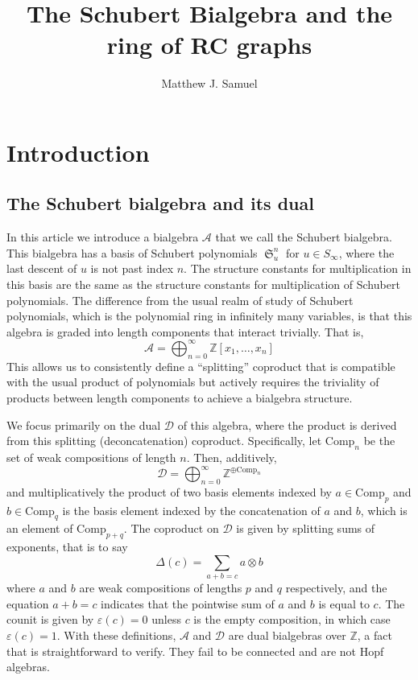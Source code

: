 \documentclass{amsart}
\title{The Schubert Bialgebra and the ring of RC graphs}
\author{Matthew J. Samuel}
\theoremstyle{definition}
\theoremstyle{remark}
\numberwithin{equation}{subsection}
\DeclareMathOperator{\sch}{\mathfrak{S}}
\newcommand{\coma}{\mathcal{A}}
\newcommand{\dcoma}{\mathcal{D}}
\begin{document}
	\maketitle
	
\section{Introduction}

\subsection*{The Schubert bialgebra and its dual} In this article we introduce a bialgebra $\coma$ that we call the Schubert bialgebra. This bialgebra has a basis of Schubert polynomials $\sch_u^n$ for $u\in S_\infty$, where the last descent of $u$ is not past index $n$. The structure constants for multiplication in this basis are the same as the structure constants for multiplication of Schubert polynomials. The difference from the usual realm of study of Schubert polynomials, which is the polynomial ring in infinitely many variables, is that this algebra is graded into length components that interact trivially. That is,
$$\coma = \bigoplus_{n=0}^\infty \mathbb{Z}[x_1,\ldots,x_n]$$
This allows us to consistently define a ``splitting'' coproduct that is compatible with the usual product of polynomials but actively requires the triviality of products between length components to achieve a bialgebra structure.

We focus primarily on the dual $\dcoma$ of this algebra, where the product is derived from this splitting (deconcatenation) coproduct. Specifically, let $\mathrm{Comp}_n$ be the set of weak compositions of length $n$. Then, additively,
$$\dcoma = \bigoplus_{n=0}^\infty \mathbb{Z}^{\oplus \mathrm{Comp}_n}$$
and multiplicatively the product of two basis elements indexed by $a\in \mathrm{Comp}_p$ and $b\in \mathrm{Comp}_q$ is the basis element indexed by the concatenation of $a$ and $b$, which is an element of $\mathrm{Comp}_{p+q}$. The coproduct on $\dcoma$ is given by splitting sums of exponents, that is to say
$$\Delta(c) = \sum_{a+b=c} a\otimes b$$
where $a$ and $b$ are weak compositions of lengths $p$ and $q$ respectively, and the equation $a+b=c$ indicates that the pointwise sum of $a$ and $b$ is equal to $c$. The counit is given by $\varepsilon(c)=0$ unless $c$ is the empty composition, in which case $\varepsilon(c)=1$. With these definitions, $\coma$ and $\dcoma$ are dual bialgebras over $\mathbb{Z}$, a fact that is straightforward to verify. They fail to be connected and are not Hopf algebras.
\end{document}
